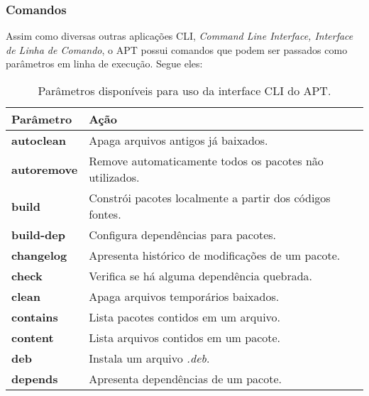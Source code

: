 \subsubsection*{Comandos} %
\label{ssub:comandos}

Assim como diversas outras aplicações CLI, \textit{Command Line Interface, Interface de Linha de Comando}, o {\code APT} possui comandos que podem ser passados como parâmetros em linha de execução. Segue eles:

\begin{longtable}{lm{11cm}}
\caption{Parâmetros disponíveis para uso da interface CLI do APT.}\\
\toprule
\textbf{Parâmetro} & \textbf{Ação} \\ 
\midrule
	\textbf{\code autoclean} & Apaga arquivos antigos já baixados. \\ %
	\rowcolor[gray]{0.8}
	\textbf{\code autoremove} & Remove automaticamente todos os pacotes não utilizados. \\ %
	\textbf{\code build} & Constrói pacotes localmente a partir dos códigos fontes. \\ %
	\rowcolor[gray]{0.8}
	\textbf{\code build-dep} & Configura dependências para pacotes. \\ %
	\textbf{\code changelog} & Apresenta histórico de modificações de um pacote. \\ %
	\rowcolor[gray]{0.8}
	\textbf{\code check} & Verifica se há alguma dependência quebrada. \\ %
	\textbf{\code clean} & Apaga arquivos temporários baixados. \\ %
	\rowcolor[gray]{0.8}
	\textbf{\code contains} & Lista pacotes contidos em um arquivo. \\ %
	\textbf{\code content} & Lista arquivos contidos em um pacote. \\ %
	\rowcolor[gray]{0.8}
	\textbf{\code deb} & Instala um arquivo \textit{.deb}. \\ %
	\textbf{\code depends} & Apresenta dependências de um pacote. \\ %

\end{longtable}
